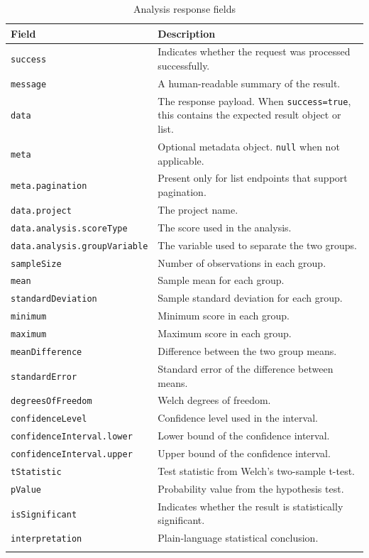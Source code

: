 \documentclass[12pt,a4paper]{article}
\begin{document}
\begin{longtable}{p{5cm} p{8cm}}
\toprule
\textbf{Field} & \textbf{Description} \\
\midrule
\texttt{success} & Indicates whether the request was processed successfully. \\
\texttt{message} & A human-readable summary of the result. \\
\texttt{data} & The response payload. When \texttt{success=true}, this contains the expected result object or list. \\
\texttt{meta} & Optional metadata object. \texttt{null} when not applicable. \\
\texttt{meta.pagination} & Present only for list endpoints that support pagination. \\
\texttt{data.project} & The project name. \\
\texttt{data.analysis.scoreType} & The score used in the analysis. \\
\texttt{data.analysis.groupVariable} & The variable used to separate the two groups. \\
\texttt{sampleSize} & Number of observations in each group. \\
\texttt{mean} & Sample mean for each group. \\
\texttt{standardDeviation} & Sample standard deviation for each group. \\
\texttt{minimum} & Minimum score in each group. \\
\texttt{maximum} & Maximum score in each group. \\
\texttt{meanDifference} & Difference between the two group means. \\
\texttt{standardError} & Standard error of the difference between means. \\
\texttt{degreesOfFreedom} & Welch degrees of freedom. \\
\texttt{confidenceLevel} & Confidence level used in the interval. \\
\texttt{confidenceInterval.lower} & Lower bound of the confidence interval. \\
\texttt{confidenceInterval.upper} & Upper bound of the confidence interval. \\
\texttt{tStatistic} & Test statistic from Welch's two-sample t-test. \\
\texttt{pValue} & Probability value from the hypothesis test. \\
\texttt{isSignificant} & Indicates whether the result is statistically significant. \\
\texttt{interpretation} & Plain-language statistical conclusion. \\
\bottomrule
\caption{Analysis response fields}
\end{longtable}
\end{document}
